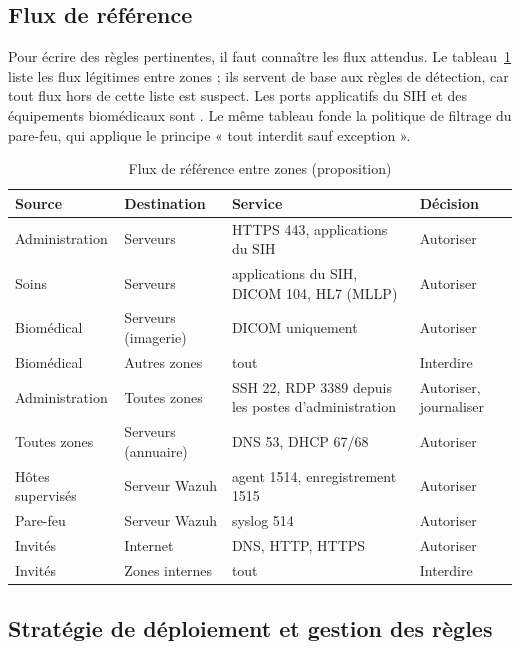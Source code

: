 \subsection{Flux de référence}

Pour écrire des règles pertinentes, il faut connaître les flux attendus. Le tableau~\ref{tab:flux} liste les flux légitimes entre zones ; ils servent de base aux règles de détection, car tout flux hors de cette liste est suspect. Les ports applicatifs du SIH et des équipements biomédicaux sont . Le même tableau fonde la politique de filtrage du pare-feu, qui applique le principe « tout interdit sauf exception »\cite{nist80041}.

\begin{table}[htbp]
\centering
\small
\begin{tabularx}{\textwidth}{llXl}
\hline
\textbf{Source} & \textbf{Destination} & \textbf{Service} & \textbf{Décision} \\
\hline
Administration & Serveurs & HTTPS 443, applications du SIH & Autoriser \\
Soins & Serveurs & applications du SIH, DICOM 104, HL7 (MLLP) & Autoriser \\
Biomédical & Serveurs (imagerie) & DICOM uniquement & Autoriser \\
Biomédical & Autres zones & tout & Interdire \\
Administration & Toutes zones & SSH 22, RDP 3389 depuis les postes d'administration & Autoriser, journaliser \\
Toutes zones & Serveurs (annuaire) & DNS 53, DHCP 67/68 & Autoriser \\
Hôtes supervisés & Serveur Wazuh & agent 1514, enregistrement 1515 & Autoriser \\
Pare-feu & Serveur Wazuh & syslog 514 & Autoriser \\
Invités & Internet & DNS, HTTP, HTTPS & Autoriser \\
Invités & Zones internes & tout & Interdire \\
\hline
\end{tabularx}
\caption{Flux de référence entre zones (proposition)}
\label{tab:flux}
\end{table}

\subsection{Stratégie de déploiement et gestion des règles}

